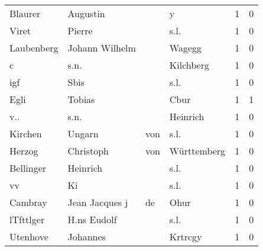 \begin{tabular}{llllrr}
                  Blaurer &                           Augustin &             &                                           y &          1 &         0 \\
                    Viret &                             Pierre &             &                                        s.l. &          1 &         0 \\
               Laubenberg &                     Johann Wilhelm &             &                                      Wagegg &          1 &         0 \\
                        c &                               s.n. &             &                                   Kilchberg &          1 &         0 \\
                      igf &                               Sbis &             &                                        s.l. &          1 &         0 \\
                     Egli &                             Tobias &             &                                        Cbur &          1 &         1 \\
                      v.. &                               s.n. &             &                                    Heinrich &          1 &         0 \\
                  Kirchen &                             Ungarn &         von &                                        s.l. &          1 &         0 \\
                   Herzog &                          Christoph &         von &                                 Württemberg &          1 &         0 \\
                Bellinger &                           Heinrich &             &                                        s.l. &          1 &         0 \\
                       vv &                                 Ki &             &                                        s.l. &          1 &         0 \\
                  Cambray &                     Jean Jacques j &          de &                                        Ohur &          1 &         0 \\
                lTfttlger &                        H.ns Eudolf &             &                                        s.l. &          1 &         0 \\
                 Utenhove &                           Johannes &             &                                     Krtrcgy &          1 &         0 \\

\end{tabular}
